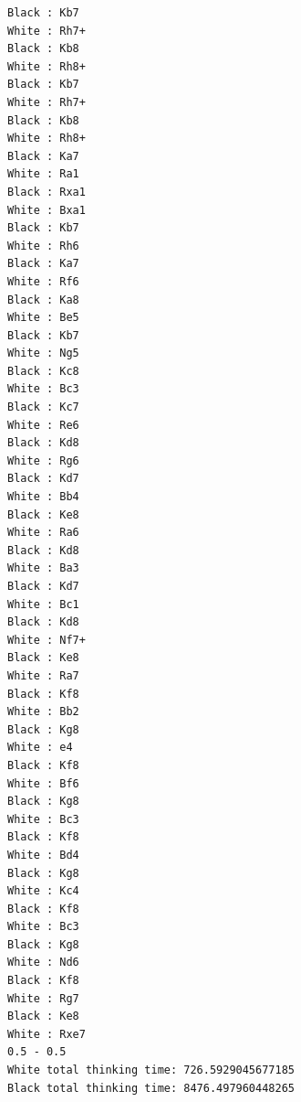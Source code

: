 \documentclass[12pt, a4paper, uplatex]{jsarticle}
\begin{document}
\begin{verbatim}
Black : Kb7
White : Rh7+
Black : Kb8
White : Rh8+
Black : Kb7
White : Rh7+
Black : Kb8
White : Rh8+
Black : Ka7
White : Ra1
Black : Rxa1
White : Bxa1
Black : Kb7
White : Rh6
Black : Ka7
White : Rf6
Black : Ka8
White : Be5
Black : Kb7
White : Ng5
Black : Kc8
White : Bc3
Black : Kc7
White : Re6
Black : Kd8
White : Rg6
Black : Kd7
White : Bb4
Black : Ke8
White : Ra6
Black : Kd8
White : Ba3
Black : Kd7
White : Bc1
Black : Kd8
White : Nf7+
Black : Ke8
White : Ra7
Black : Kf8
White : Bb2
Black : Kg8
White : e4
Black : Kf8
White : Bf6
Black : Kg8
White : Bc3
Black : Kf8
White : Bd4
Black : Kg8
White : Kc4
Black : Kf8
White : Bc3
Black : Kg8
White : Nd6
Black : Kf8
White : Rg7
Black : Ke8
White : Rxe7
0.5 - 0.5
White total thinking time: 726.5929045677185
Black total thinking time: 8476.497960448265
\end{verbatim}
\end{document}
